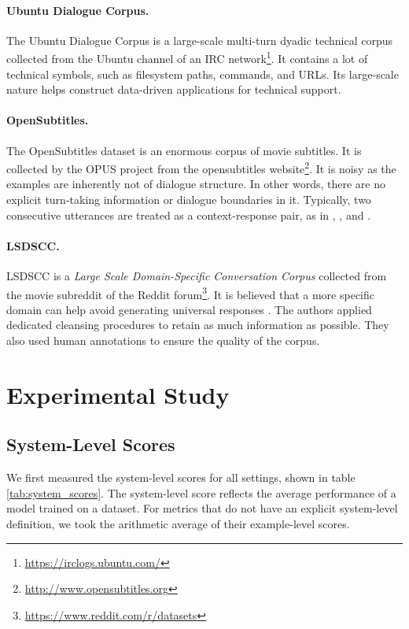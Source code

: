 \documentclass[runningheads]{llncs}
\begin{document}
    \paragraph{Ubuntu Dialogue Corpus.}
    The Ubuntu Dialogue Corpus \cite{ubuntu_corpus} is a large-scale multi-turn dyadic technical corpus collected from the Ubuntu channel of an IRC network\footnote{\url{https://irclogs.ubuntu.com/}}. It contains a lot of technical symbols, such as filesystem paths, commands, and URLs. Its large-scale nature helps construct data-driven applications for technical support.

    \paragraph{OpenSubtitles.}
    The OpenSubtitles dataset \cite{opensub} is an enormous corpus of movie subtitles. It is collected by the OPUS project \cite{OPUS} from the opensubtitles website\footnote{\url{http://www.opensubtitles.org}}. It is noisy as the examples are inherently not of dialogue structure. In other words, there are no explicit turn-taking information or dialogue boundaries in it. Typically, two consecutive utterances are treated as a context-response pair, as in \cite{GoogleChatbot}, \cite{MMI}, and \cite{persona}.

    \paragraph{LSDSCC.}
    LSDSCC \cite{LSDSCC} is a \emph{Large Scale Domain-Specific Conversation Corpus} collected from the movie subreddit of the Reddit forum\footnote{\url{https://www.reddit.com/r/datasets}}. It is believed that a more specific domain can help avoid generating universal responses \cite{LSDSCC}. The authors applied dedicated cleansing procedures to retain as much information as possible. They also used human annotations to ensure the quality of the corpus.

    \section{Experimental Study}
    \subsection{System-Level Scores}
    
    We first measured the system-level scores for all settings, shown in table \ref{tab:system_scores}. The system-level score reflects the average performance of a model trained on a dataset. For metrics that do not have an explicit system-level definition, we took the arithmetic average of their example-level scores.
\end{document}
